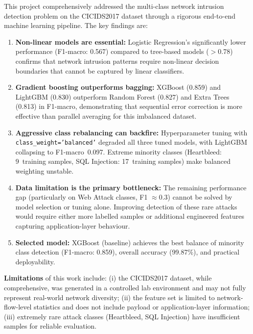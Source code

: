 \documentclass[12pt, a4paper]{article}
\begin{document}
This project comprehensively addressed the multi-class network intrusion detection problem on the CICIDS2017 dataset through a rigorous end-to-end machine learning pipeline.
The key findings are:

\begin{enumerate}
    \item \textbf{Non-linear models are essential:} Logistic Regression's significantly lower performance (F1-macro: 0.567) compared to tree-based models ($>$0.78) confirms that network intrusion patterns require non-linear decision boundaries that cannot be captured by linear classifiers.

    \item \textbf{Gradient boosting outperforms bagging:} XGBoost (0.859) and LightGBM (0.830) outperform Random Forest (0.827) and Extra Trees (0.813) in F1-macro, demonstrating that sequential error correction is more effective than parallel averaging for this imbalanced dataset.

    \item \textbf{Aggressive class rebalancing can backfire:} Hyperparameter tuning with \texttt{class\_weight='balanced'} degraded all three tuned models, with LightGBM collapsing to F1-macro~0.097.
    Extreme minority classes (Heartbleed: 9~training samples, SQL Injection: 17~training samples) make balanced weighting unstable.

    \item \textbf{Data limitation is the primary bottleneck:} The remaining performance gap (particularly on Web Attack classes, F1 $\approx$0.3) cannot be solved by model selection or tuning alone.
    Improving detection of these rare attacks would require either more labelled samples or additional engineered features capturing application-layer behaviour.

    \item \textbf{Selected model:} XGBoost (baseline) achieves the best balance of minority class detection (F1-macro: 0.859), overall accuracy (99.87\%), and practical deployability.
\end{enumerate}

\noindent
\textbf{Limitations} of this work include: (i) the CICIDS2017 dataset, while comprehensive, was generated in a controlled lab environment and may not fully represent real-world network diversity; (ii) the feature set is limited to network-flow-level statistics and does not include payload or application-layer information; (iii) extremely rare attack classes (Heartbleed, SQL Injection) have insufficient samples for reliable evaluation.
\end{document}
